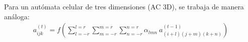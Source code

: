 Para un autómata celular de tres dimensiones (AC 3D), se trabaja de manera análoga:
\begin{equation}
    \label{eq:evolution_rule_3d}
    \begin{aligned}
        a_{ijk}^{(t)} = f(\sum^{l=r}_{l=-r}\sum^{m=r}_{m=-r}\sum^{n=r}_{n=-r}{\alpha_{lmn}\ a_{(i+l)(j+m)(k+n)}^{(t-1)}})
    \end{aligned}
\end{equation}